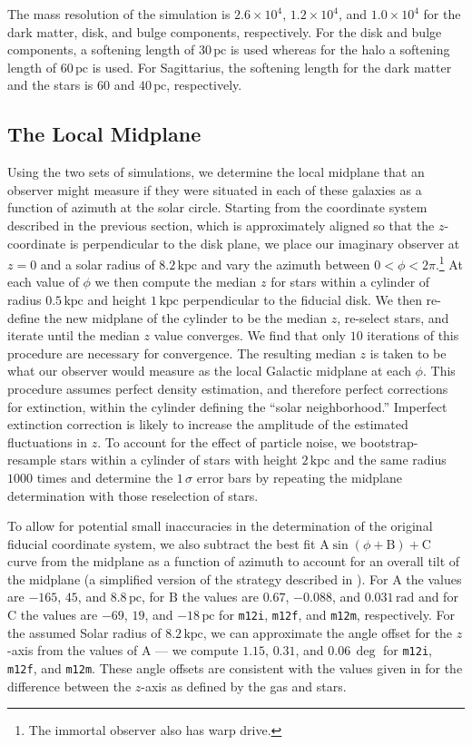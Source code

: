 \documentclass[twocolumn]{aastex62}
\newcommand{\pc}{\text{pc}}
\newcommand{\kpc}{\text{kpc}}
\newcommand{\mi}{\texttt{m12i}}
\newcommand{\mf}{\texttt{m12f}}
\newcommand{\mm}{\texttt{m12m}}
\begin{document}
The mass resolution of the simulation is $2.6\times10^4$, $1.2\times10^4$, and
$1.0\times10^4$ for the dark matter, disk, and bulge components, respectively.
For the disk and bulge components, a softening length of $30\,\pc$ is used
whereas for the halo a softening length of $60\,\pc$ is used. For Sagittarius,
the softening length for the dark matter and the stars is $60$ and $40\,\pc$,
respectively.

\subsection{The Local Midplane} \label{ssec:local_midplane}
Using the two sets of simulations, we determine the local midplane that an observer
might measure if they were situated in each of these galaxies as a function of
azimuth at the solar circle. Starting from the coordinate system described in
the previous section, which is approximately aligned so that the
$z$-coordinate is perpendicular to the disk plane, we place our imaginary
observer at $z=0$ and a solar radius of $8.2\,\kpc$ and vary the azimuth
between $0<\phi<2\pi$.\footnote{The immortal observer also has warp
drive.} At each value of $\phi$ we then compute the median $z$ for stars
within a cylinder of radius $0.5\,\kpc$ and height $1\,\kpc$ perpendicular to
the fiducial disk. We then re-define the new midplane of the cylinder to be the median $z$, re-select stars, and iterate until the median $z$ value
converges. We find that only $10$ iterations of this procedure are necessary
for convergence. The resulting median $z$ is taken to be what our observer
would measure as the local Galactic midplane at each $\phi$. This procedure
assumes perfect density estimation, and therefore perfect corrections for
extinction, within the cylinder defining the ``solar neighborhood.'' Imperfect
extinction correction is likely to increase the amplitude of the estimated
fluctuations in $z$. To account for the effect of particle noise, we
bootstrap-resample stars within a cylinder of stars with height $2\,\kpc$ and
the same radius $1000$ times and determine the $1\,\sigma$ error bars by repeating the midplane determination with those reselection of stars.

To allow for potential small inaccuracies in the determination of the original
fiducial coordinate system, we also subtract the best fit $\text{A}
\sin{\left(\phi + \text{B}\right)} + \text{C}$ curve from the midplane as a
function of azimuth to account for an overall tilt of the midplane (a
simplified version of the strategy described in
\citealt{2019ApJ...871..145A}). For $\text{A}$ the values are $-165$, $45$,
and $8.8\,\pc$, for $\text{B}$ the values are $0.67$, $-0.088$, and
$0.031\,\text{rad}$ and for $\text{C}$ the values are $-69$, $19$, and
$-18\,\pc$ for \mi{}, \mf{}, and \mm{}, respectively. For the assumed Solar
radius of $8.2\,\kpc$, we can approximate the angle offset for the $z$-axis
from the values of $\text{A}$ --- we compute $1.15$, $0.31$, and $0.06\,\deg$
for \mi{}, \mf{}, and \mm{}. These angle offsets are consistent with the
values given in \citet{2018arXiv180610564S} for the difference between the
$z$-axis as defined by the gas and stars.
\end{document}
